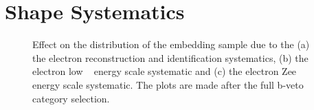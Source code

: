 \section{Shape Systematics}
\label{appendix:shapeNPs}


\begin{figure}[htp]
     \begin{center}

	


    \end{center}
    \caption{Effect on the \mmc distribution of the embedding sample due to the (a) the electron reconstruction and identification systematics, (b) the electron low \pt~ energy scale systematic and (c) the electron Zee energy scale systematic. The plots are made after the full b-veto category selection.}
   \label{fig:ElecShapeNPs}
\end{figure}
